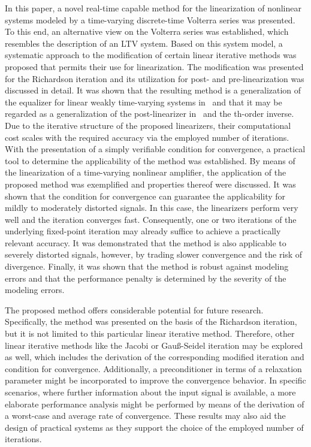 \documentclass[10pt,twocolumn,twoside]{IEEEtran}
\begin{document}
In this paper, a novel real-time capable method for the linearization of nonlinear systems
modeled by a time-varying discrete-time Volterra series was presented.
To this end, an alternative view on the Volterra series was established,
which resembles the description of an LTV system. Based on this system model,
a systematic approach to the modification of certain linear iterative methods was
proposed that permits their use for linearization. The modification was
presented for the Richardson iteration and its
utilization for post- and pre-linearization was discussed in detail.
It was shown that the resulting method is a generalization of the equalizer for
linear weakly time-varying systems in~\cite{soudan2012} and that it may
be regarded as a generalization of the post-linearizer in~\cite{nowak1997}
and the th-order inverse.
Due to the iterative structure of the proposed linearizers, their computational cost
scales with the required accuracy via the employed number of iterations.
With the presentation of a simply verifiable
condition for convergence, a practical tool to determine the applicability
of the method was established. By means of the linearization of a time-varying
nonlinear amplifier, the application of the proposed method was exemplified
and properties thereof were discussed. It was shown that the condition for
convergence can guarantee the applicability for mildly to moderately
distorted signals. In this case, the linearizers perform very well and the
iteration converges fast. Consequently, one or two iterations of the
underlying fixed-point iteration may already suffice to achieve a
practically relevant accuracy. It was demonstrated that the
method is also applicable to severely distorted signals, however,
by trading slower convergence and the risk of divergence.
Finally, it was shown that the method
is robust against modeling errors and that the performance penalty
is determined by the severity of the modeling errors.

The proposed method offers considerable potential for future research. Specifically,
the method was presented on the basis of the Richardson iteration, but it is
not limited to this particular linear iterative method. Therefore, other linear
iterative methods like the Jacobi or Gau\ss-Seidel iteration may be explored as
well, which includes the derivation of the corresponding modified iteration and
condition for convergence. Additionally, a preconditioner in terms of a
relaxation parameter might be incorporated to improve the convergence behavior.
In specific scenarios, where further information about the input
signal is available, a more elaborate performance analysis might be performed
by means of the derivation of a worst-case and average rate of convergence.
These results may also aid the design of practical systems as they support
the choice of the employed number of iterations.
\end{document}
